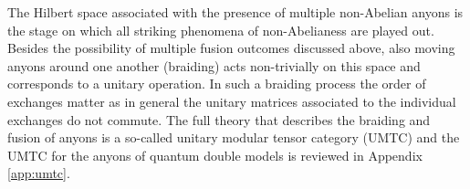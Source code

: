 \documentclass[two column]{article}
\newcommand{\jovan}[1]{\textcolor{blue}{[#1]}}
\begin{document}
The Hilbert space associated with the presence of multiple non-Abelian anyons is the stage on which all striking phenomena of non-Abelianess are played out. Besides the possibility of multiple fusion outcomes discussed above,  also moving anyons around one another (braiding) acts non-trivially on this space and corresponds to a unitary operation. In such a braiding process the order of exchanges matter as in general the unitary matrices associated to the individual exchanges do not commute. The full theory that describes the braiding and fusion of anyons is a so-called unitary modular tensor category (UMTC)\cite{Kitaev_2003} and the UMTC for the anyons of quantum double models is reviewed in Appendix \ref{app:umtc}.

%
%
%
%
%
%
%
%
\end{document}
